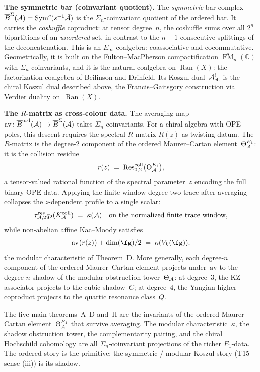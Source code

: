 \medskip
\noindent\textbf{The symmetric bar (coinvariant quotient).}\enspace
The \emph{symmetric} bar complex
$\overline{B}^{\Sigma}(\mathcal{A}) = \operatorname{Sym}^c(s^{-1}\bar{\mathcal{A}})$ is the
$\Sigma_n$-coinvariant quotient of the ordered bar. It carries the
\emph{coshuffle} coproduct: at tensor degree~$n$, the coshuffle sums
over all $2^n$ bipartitions of an \emph{unordered} set, in contrast to
the $n+1$ consecutive splittings of the deconcatenation. This is an
$E_\infty$-coalgebra: coassociative and cocommutative. Geometrically,
it is built on the Fulton--MacPherson compactification
$\overline{\operatorname{FM}}_n(\mathbb C)$ with
$\Sigma_n$-coinvariants, and it is the natural coalgebra on
$\operatorname{Ran}(X)$: the factorization coalgebra of Beilinson and
Drinfeld. Its Koszul dual~$\mathcal{A}^!_{\mathrm{ch}}$ is the chiral Koszul
dual described above, the Francis--Gaitsgory construction via Verdier
duality on~$\operatorname{Ran}(X)$.

\medskip
\noindent\textbf{The $R$-matrix as cross-colour data.}\enspace
The averaging map
$\mathrm{av}\colon\overline{B}^{\mathrm{ord}}(\mathcal{A})\to\overline{B}^{\Sigma}(\mathcal{A})$
takes $\Sigma_n$-coinvariants. For a chiral algebra with OPE poles,
this descent requires the spectral $R$-matrix
$R(z)$ as twisting datum. The $R$-matrix is the degree-$2$ component
of the ordered Maurer--Cartan element~$\Theta^{E_1}_{\mathcal{A}}$: it is
the collision residue
\[
r(z) \;=\; \operatorname{Res}^{\mathrm{coll}}_{0,2}
\bigl(\Theta^{E_1}_{\mathcal{A}}\bigr),
\]
a tensor-valued rational function of the spectral parameter~$z$
encoding the full binary OPE data. Applying the finite-window
degree-two trace after averaging collapses the $z$-dependent profile
to a single scalar:
\[
\tau_{\mathcal{A},2}^{\mathrm{res}}q_2(K_{\mathcal{A}}^{\mathrm{coll}})
\;=\;\kappa(\mathcal{A})
\quad \text{on the normalized finite trace window,}
\]
while non-abelian affine Kac--Moody satisfies
\[
\mathrm{av}\bigl(r(z)\bigr) + \dim(\fg)/2 \;=\; \kappa(V_k(\fg)).
\]
the modular characteristic of Theorem~D\@. More generally, each
degree-$n$ component of the ordered Maurer--Cartan element projects
under~$\mathrm{av}$ to the degree-$n$ shadow of the modular
obstruction tower~$\Theta_{\mathcal{A}}$: at degree~$3$, the KZ associator
projects to the cubic shadow~$C$; at degree~$4$, the Yangian higher
coproduct projects to the quartic resonance class~$Q$.

The five main theorems~A--D and~H are the invariants of the ordered
Maurer--Cartan element~$\Theta^{E_1}_{\mathcal{A}}$ that survive averaging.
The modular characteristic~$\kappa$, the shadow obstruction tower, the
complementarity pairing, and the chiral Hochschild cohomology are all
$\Sigma_n$-coinvariant projections of the richer $E_1$-data. The
ordered story is the primitive; the symmetric / modular-Koszul story (T15 sense (iii)) is its shadow.

